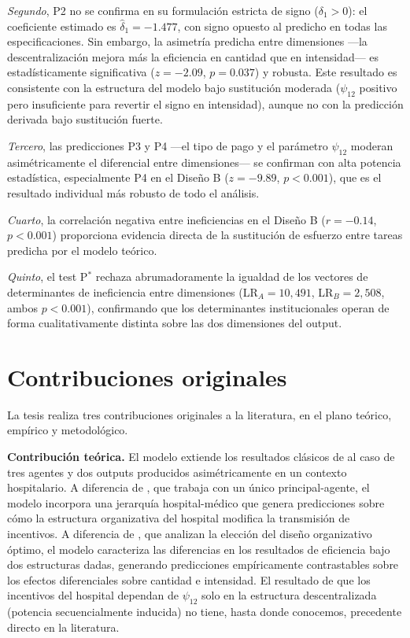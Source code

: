 \documentclass[12pt, a4paper, twoside, openright]{book}
\theoremstyle{plain}
\theoremstyle{definition}
\theoremstyle{remark}
\begin{document}
\textit{Segundo}, P2 no se confirma en su formulación estricta de signo ($\delta_1 > 0$): el coeficiente estimado es $\hat{\delta}_1 = -1.477$, con signo opuesto al predicho en todas las especificaciones. Sin embargo, la asimetría predicha entre dimensiones ---la descentralización mejora más la eficiencia en cantidad que en intensidad--- es estadísticamente significativa ($z = -2.09$, $p = 0.037$) y robusta. Este resultado es consistente con la estructura del modelo bajo sustitución moderada ($\psi_{12}$ positivo pero insuficiente para revertir el signo en intensidad), aunque no con la predicción derivada bajo sustitución fuerte.

\textit{Tercero}, las predicciones P3 y P4 ---el tipo de pago y el parámetro $\psi_{12}$ moderan asimétricamente el diferencial entre dimensiones--- se confirman con alta potencia estadística, especialmente P4 en el Diseño B ($z=-9.89$, $p<0.001$), que es el resultado individual más robusto de todo el análisis.

\textit{Cuarto}, la correlación negativa entre ineficiencias en el Diseño B ($r=-0.14$, $p<0.001$) proporciona evidencia directa de la sustitución de esfuerzo entre tareas predicha por el modelo teórico.

\textit{Quinto}, el test P$^*$ rechaza abrumadoramente la igualdad de los vectores de determinantes de ineficiencia entre dimensiones (LR$_A=10{,}491$, LR$_B=2{,}508$, ambos $p<0.001$), confirmando que los determinantes institucionales operan de forma cualitativamente distinta sobre las dos dimensiones del output.

\section{Contribuciones originales}

La tesis realiza tres contribuciones originales a la literatura, en el plano teórico, empírico y metodológico.

\textbf{Contribución teórica.} El modelo extiende los resultados clásicos de \citet{holmstrom1991} al caso de tres agentes y dos outputs producidos asimétricamente en un contexto hospitalario. A diferencia de \citet{holmstrom1991}, que trabaja con un único principal-agente, el modelo incorpora una jerarquía hospital-médico que genera predicciones sobre cómo la estructura organizativa del hospital modifica la transmisión de incentivos. A diferencia de \citet{jelovac2002}, que analizan la elección del diseño organizativo óptimo, el modelo caracteriza las diferencias en los resultados de eficiencia bajo dos estructuras dadas, generando predicciones empíricamente contrastables sobre los efectos diferenciales sobre cantidad e intensidad. El resultado de que los incentivos del hospital dependan de $\psi_{12}$ solo en la estructura descentralizada (potencia secuencialmente inducida) no tiene, hasta donde conocemos, precedente directo en la literatura.
\end{document}
